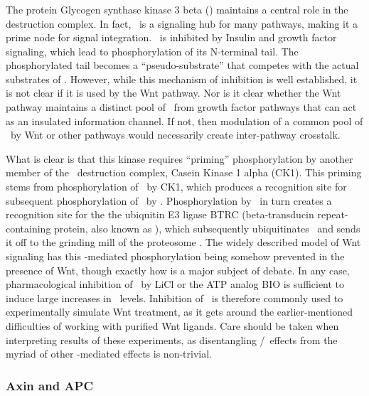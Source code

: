 \subsubsection{\gsk}

The protein Glycogen synthase kinase 3 beta (\gsk) maintains
a central role in the destruction complex. In fact, \gsk\ is
a signaling hub for many pathways, making it a prime node
for signal integration. \gsk\ is inhibited by Insulin and
growth factor signaling, which lead to phosphorylation of its N-terminal
tail. The phosphorylated tail becomes a ``pseudo-substrate'' that competes with the
actual substrates of \gsk. However, while this mechanism of inhibition
is well established, it is not clear if it is used by the Wnt
pathway. Nor is it clear whether the Wnt pathway maintains
a distinct pool of \gsk\ from growth factor pathways that can act
as an insulated information channel. If not, then modulation of a
common pool of \gsk\ by Wnt or other pathways would necessarily
create inter-pathway crosstalk.


What is clear is that this kinase requires ``priming'' phosphorylation
by another member of the \bcat\ destruction complex,
Casein Kinase 1 alpha (CK1\textalpha). This priming stems from phosphorylation 
of \bcat\ by CK1\textalpha, which produces a recognition site for subsequent
phosphorylation of \bcat\ by \gsk. Phosphorylation by
\gsk\ in turn creates a recognition site for the the ubiquitin E3 ligase
BTRC (beta-transducin repeat-containing protein, also known as ),
which subsequently ubiquitinates \bcat\ and sends it
off to the grinding mill of the proteosome
\cite{Frame2001,Hernandez2012}. The widely described model of
Wnt signaling has this \gsk-mediated phosphorylation being somehow
prevented in the presence of Wnt, though exactly how is a major subject of debate.
In any case, pharmacological inhibition of \gsk\ by LiCl
\cite{Stambolic1996,Hedgepeth1997} or the
ATP analog BIO \cite{Meijer2003} is sufficient to induce large increases in \bcat\ levels.
Inhibition of \gsk\ is therefore commonly used to experimentally simulate Wnt
treatment, as it gets around the earlier-mentioned difficulties
of working with purified Wnt ligands. Care should be taken when interpreting
results of these experiments, as disentangling \gsk/\bcat\ effects from the myriad of other
\gsk-mediated effects is non-trivial.


\subsubsection{Axin and APC}

